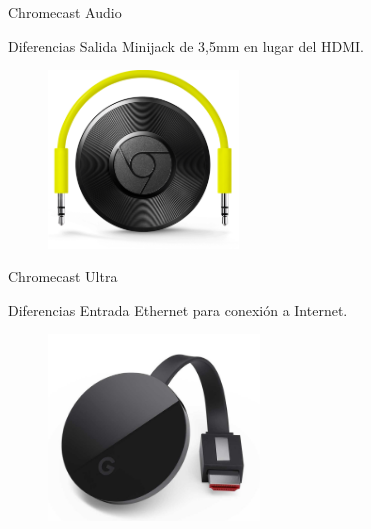 \begin{frame}{Chromecast Audio}
	\begin{block}{Diferencias}
		Salida Minijack de 3,5mm en lugar del HDMI.
	\end{block}

	\begin{figure}[h]
		\centering
		\includegraphics[width=0.45\textwidth]{./Imagenes/chromecastaudio.png}
	\end{figure}
\end{frame}


\begin{frame}{Chromecast Ultra}
	\begin{block}{Diferencias}
		Entrada Ethernet para conexión a Internet.
	\end{block}

	\begin{figure}[h]
		\centering
		\includegraphics[width=0.5\textwidth]{./Imagenes/chromecast-ultra.jpg}
	\end{figure}
\end{frame}
